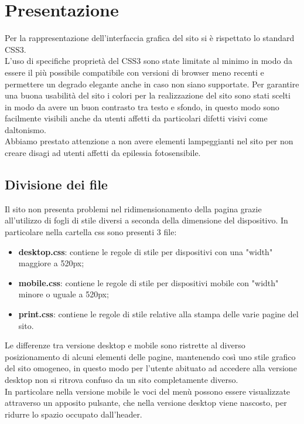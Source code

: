 \section{Presentazione}
Per la rappresentazione dell'interfaccia grafica del sito si è rispettato lo standard CSS3.\\
L'uso di specifiche proprietà del CSS3 sono state limitate al minimo in modo da essere il più possibile compatibile con versioni di browser meno recenti e permettere un degrado elegante anche in caso non siano supportate.
Per garantire una buona usabilità del sito i colori per la realizzazione del sito sono stati scelti in modo da avere un buon contrasto tra testo e sfondo, in questo modo sono facilmente visibili anche da utenti affetti da particolari
difetti visivi come daltonismo.\\
Abbiamo prestato attenzione a non avere elementi lampeggianti nel sito per non creare disagi ad utenti affetti da epilessia fotosensibile.

\subsection{Divisione dei file}
Il sito non presenta problemi nel ridimensionamento della pagina grazie all'utilizzo di fogli di stile diversi a seconda della dimensione del dispositivo. In particolare nella cartella css sono presenti 3 file:
\begin{itemize} 
	\item \textbf{desktop.css}: contiene le regole di stile per dispositivi con una "width" maggiore a 520px; 
	\item \textbf{mobile.css}: contiene le regole di stile per dispositivi mobile con "width" minore o uguale a 520px;
	\item \textbf{print.css}: contiene le regole di stile relative alla stampa delle varie pagine del sito.
\end{itemize}
Le differenze tra versione desktop e mobile sono ristrette al diverso posizionamento di alcuni elementi delle pagine, mantenendo così uno stile grafico del sito omogeneo, in questo modo per l'utente abituato ad accedere alla
versione desktop non si ritrova confuso da un sito completamente diverso. \\
In particolare nella versione mobile le voci del menù possono essere visualizzate attraverso un apposito pulsante, che nella versione desktop viene nascosto, per ridurre lo spazio occupato dall'header.